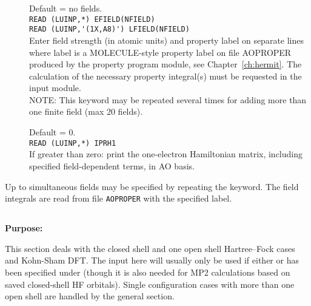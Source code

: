 \begin{description}
\item[]
  Default = no fields. \\
  \verb"READ (LUINP,*) EFIELD(NFIELD)" \\
  \verb"READ (LUINP,'(1X,A8)') LFIELD(NFIELD)" \\
  Enter field strength (in atomic units) and property label on separate lines
  where label is a MOLE\-CULE-style property label on file AOPROPER
  produced by the property program module, see Chapter~\ref{ch:hermit}.
  The calculation of the necessary property integral(s) must be requested
  in the  input module. \\
  NOTE: This keyword may be repeated several times for adding more than
  one finite field (max 20 fields).

\item[]
  Default = 0.\\
  \verb"READ (LUINP,*) IPRH1" \\
  If greater than zero:
  print the one-electron Hamiltonian matrix, including
  specified field-dependent terms, in AO basis.
\end{description}


Up to \mxfelt simultaneous fields may be specified by repeating the
 keyword.
The field integrals are read from file \verb|AOPROPER| with the specified label.


\pagebreak[3]
\subsection{\label{ref-rhfinp}}

{\bf Purpose:}

This section deals with the closed shell and one open shell
Hartree--Fock cases
and Kohn-Sham DFT. 
The input here will usually only be used if either
 or 
has been specified under 
(though it is also needed for MP2 calculations based on saved closed-shell HF
orbitals).
Single configuration cases with more than one open shell
are handled by the general  section.

